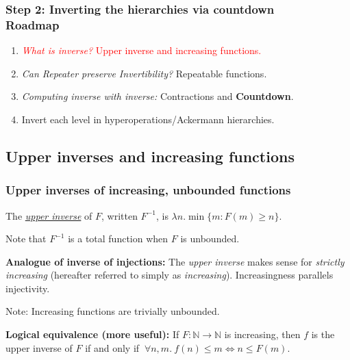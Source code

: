 \begin{frame}
\frametitle{Step 2: Inverting the hierarchies via countdown\\ Roadmap}
\begin{enumerate}\itemsep2em
	\item \textcolor<2>{red}{\emph{What is inverse?} Upper inverse and increasing functions.}
	\item \emph{Can Repeater preserve Invertibility?} Repeatable functions.
	\item \emph{Computing inverse with inverse:} Contractions and \textbf{Countdown}.
	\item Invert each level in hyperoperations/Ackermann hierarchies.
\end{enumerate}
\end{frame}


\subsection{Upper inverses and increasing functions}

\begin{frame}
\frametitle{Upper inverses of increasing, unbounded functions}
The \href{https://github.com/inv-ack/inv-ack/blob/7270e64a2600b771f2b1b1b151f7d13fb2ae6c97/inverse.v\#L28-L45}{
	\emph{upper inverse}} of $F$, written $F^{-1}$,
is $\lambda n. \min\{m : F(m)\ge n\}$.

Note that $F^{-1}$ is a total function when $F$ is unbounded.

\bigskip

\textbf{Analogue of inverse of injections:} The \emph{upper inverse} makes sense for \emph{strictly increasing} (hereafter referred to simply as \emph{increasing}). Increasingness parallels injectivity.

\smallskip
Note: Increasing functions are trivially unbounded.

\bigskip

\textbf{Logical equivalence (more useful):}
\href{https://github.com/inv-ack/inv-ack/blob/7270e64a2600b771f2b1b1b151f7d13fb2ae6c97/inverse.v\#L65-L77}{\coq} If $F:\mathbb{N}\to \mathbb{N}$ is increasing, then $f$ is the upper inverse of $F$ if and only if $\ \forall n, m.~ f(n)\le m \iff n \le F(m)$.

\end{frame}

